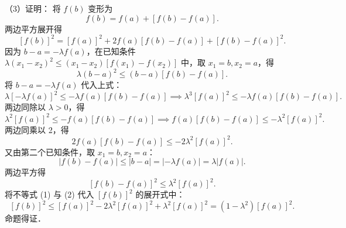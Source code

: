 \begin{answer}
（3）证明：
将 $f(b)$ 变形为
\nopagebreak[4]
\[
f(b) = f(a) + [f(b) - f(a)].
\]
两边平方展开得
\nopagebreak[4]
\[
[f(b)]^2 = [f(a)]^2 + 2f(a)[f(b) - f(a)] + [f(b) - f(a)]^2.
\]
因为 $b - a = -\lambda f(a)$，在已知条件 $\lambda(x_1 - x_2)^2 \leqslant (x_1 - x_2)[f(x_1) - f(x_2)]$ 中，取 $x_1 = b, x_2 = a$，得
\nopagebreak[4]
\[
\lambda(b - a)^2 \leqslant (b - a)[f(b) - f(a)].
\]
将 $b - a = -\lambda f(a)$ 代入上式：
\nopagebreak[4]
\[
\lambda[-\lambda f(a)]^2 \leqslant -\lambda f(a)[f(b) - f(a)] \implies \lambda^3 [f(a)]^2 \leqslant -\lambda f(a)[f(b) - f(a)].
\]
两边同除以 $\lambda > 0$，得
\nopagebreak[4]
\[
\lambda^2 [f(a)]^2 \leqslant -f(a)[f(b) - f(a)] \implies f(a)[f(b) - f(a)] \leqslant -\lambda^2 [f(a)]^2.
\]
两边同乘以 2，得
\nopagebreak[4]
\[
2f(a)[f(b) - f(a)] \leqslant -2\lambda^2 [f(a)]^2. \tag{1}
\]
又由第二个已知条件，取 $x_1 = b, x_2 = a$：
\nopagebreak[4]
\[
|f(b) - f(a)| \leqslant |b - a| = |-\lambda f(a)| = \lambda |f(a)|.
\]
两边平方得
\nopagebreak[4]
\[
[f(b) - f(a)]^2 \leqslant \lambda^2 [f(a)]^2. \tag{2}
\]
将不等式 (1) 与 (2) 代入 $[f(b)]^2$ 的展开式中：
\nopagebreak[4]
\[
[f(b)]^2 \leqslant [f(a)]^2 - 2\lambda^2 [f(a)]^2 + \lambda^2 [f(a)]^2 = (1 - \lambda^2)[f(a)]^2.
\]
命题得证．


\end{answer}